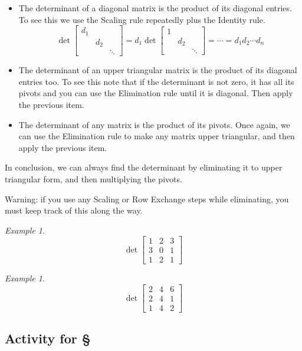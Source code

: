 \documentclass[11pt,oneside]{amsbook}
\theoremstyle{definition}
\theoremstyle{plain}
\theoremstyle{definition}
\theoremstyle{remark}
\newtheorem{example}[theorem]{Example}
\numberwithin{equation}{section}
\numberwithin{figure}{section}
\begin{document}
\begin{itemize}
  \item The determinant of a diagonal matrix is the product of its diagonal entries. To see this we use the Scaling rule repeatedly plus the Identity rule.
    \[\det\begin{bmatrix}d_1&&\\&d_2&\\&&\ddots\end{bmatrix}
      =d_1\det\begin{bmatrix}1&&\\&d_2&\\&&\ddots\end{bmatrix}
      =\cdots=d_1d_2\cdots d_n
    \]
  \item The determinant of an upper triangular matrix is the product of its diagonal entries too. To see this note that if the determinant is not zero, it has all its pivots and you can use the Elimination rule until it is diagonal. Then apply the previous item.
  \item The determinant of any matrix is the product of its pivots. Once again, we can use the Elimination rule to make any matrix upper triangular, and then apply the previous item.
\end{itemize}

In conclusion, we can always find the determinant by eliminating it to upper triangular form, and then multiplying the pivots.

Warning: if you use any Scaling or Row Exchange steps while eliminating, you must keep track of this along the way.

\begin{example}
  \[\det\begin{bmatrix}1&2&3\\3&0&1\\1&2&1\end{bmatrix}
  \]
\end{example}

\begin{example}
  \[\det\begin{bmatrix}2&4&6\\2&4&1\\1&4&2\end{bmatrix}
  \]
\end{example}
  
\newpage
\subsection*{Activity for \S \thesection}
\end{document}
